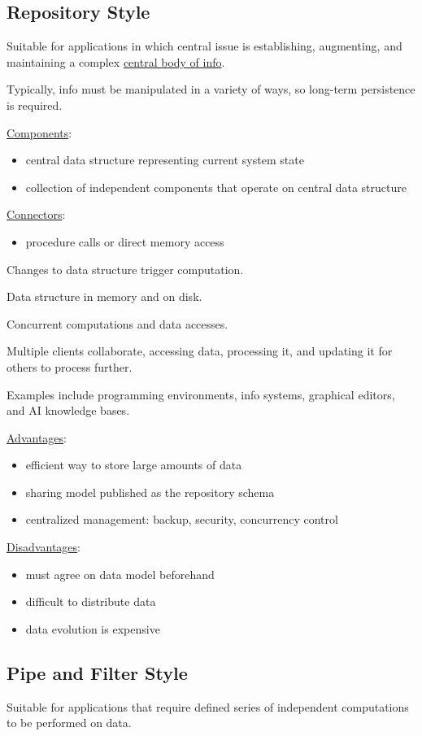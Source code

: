 \documentclass[11pt]{article}
\begin{document}
\subsection{Repository Style}
\label{sec:org5692686}
Suitable for applications in which central issue is establishing, augmenting, and maintaining a
complex \uline{central body of info}.

Typically, info must be manipulated in a variety of ways, so long-term persistence is required.

\uline{Components}:
\begin{itemize}
\item central data structure representing current system state
\item collection of independent components that operate on central data structure
\end{itemize}

\uline{Connectors}:
\begin{itemize}
\item procedure calls or direct memory access
\end{itemize}

Changes to data structure trigger computation.

Data structure in memory and on disk.

Concurrent computations and data accesses.

Multiple clients collaborate, accessing data, processing it, and updating it for others to process
further.

Examples include programming environments, info systems, graphical editors, and AI knowledge
bases.

\uline{Advantages}:
\begin{itemize}
\item efficient way to store large amounts of data
\item sharing model published as the repository schema
\item centralized management: backup, security, concurrency control
\end{itemize}

\uline{Disadvantages}:
\begin{itemize}
\item must agree on data model beforehand
\item difficult to distribute data
\item data evolution is expensive
\end{itemize}
\subsection{Pipe and Filter Style}
\label{sec:orge4f1e2a}
Suitable for applications that require defined series of independent computations to be performed on
data.
\end{document}
